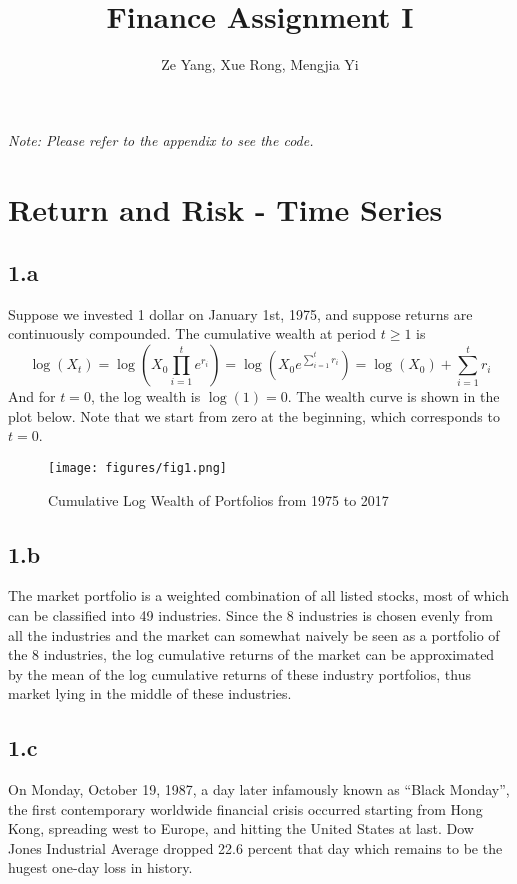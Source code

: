 \documentclass[10 pt]{hwtemplate} %
\title{\textbf{Finance Assignment I}}
\author{Ze Yang, Xue Rong, Mengjia Yi}
\begin{document}
\maketitle

\noindent\textit{Note: Please refer to the appendix to see the code.}
\section{Return and Risk - Time Series}
\subsection*{1.a }
Suppose we invested 1 dollar on January 1st, 1975, and suppose returns are continuously compounded. The cumulative wealth at period $t\geq 1$ is
\begin{equation}
  \log(X_t) = \log\left(X_0\prod_{i=1}^{t}e^{r_i}\right) = \log\left(X_0e^{\sum_{i=1}^tr_i}\right) = \log(X_0) + \sum_{i=1}^tr_i
\end{equation}
And for $t=0$, the log wealth is $\log(1)=0$. The wealth curve is shown in the plot below. Note that we start from zero at the beginning, which corresponds to $t=0$.
\begin{figure}[H]
  \centering
  \captionsetup{justification=centering}
  \caption{\label{fig:ret}Cumulative Log Wealth of Portfolios from 1975 to 2017}
  \vspace{-10pt}
  \texttt{[image: figures/fig1.png]}
\end{figure}

\subsection*{1.b}
The market portfolio is a weighted combination of all listed stocks, most of which can be classified into 49 industries. Since the 8 industries is chosen evenly from all the industries and the market can somewhat naively be seen as a portfolio of the 8 industries, the log cumulative returns of the market can be approximated by the mean of the log cumulative returns of these industry portfolios, thus market lying in the middle of these industries.


\subsection*{1.c}
On Monday, October 19, 1987\cite{crash}, a day later infamously known as “Black Monday”, the first contemporary worldwide financial crisis occurred starting from Hong Kong, spreading west to Europe, and hitting the United States at last. Dow Jones Industrial Average dropped 22.6 percent that day which remains to be the hugest one-day loss in history. 
\end{document}

